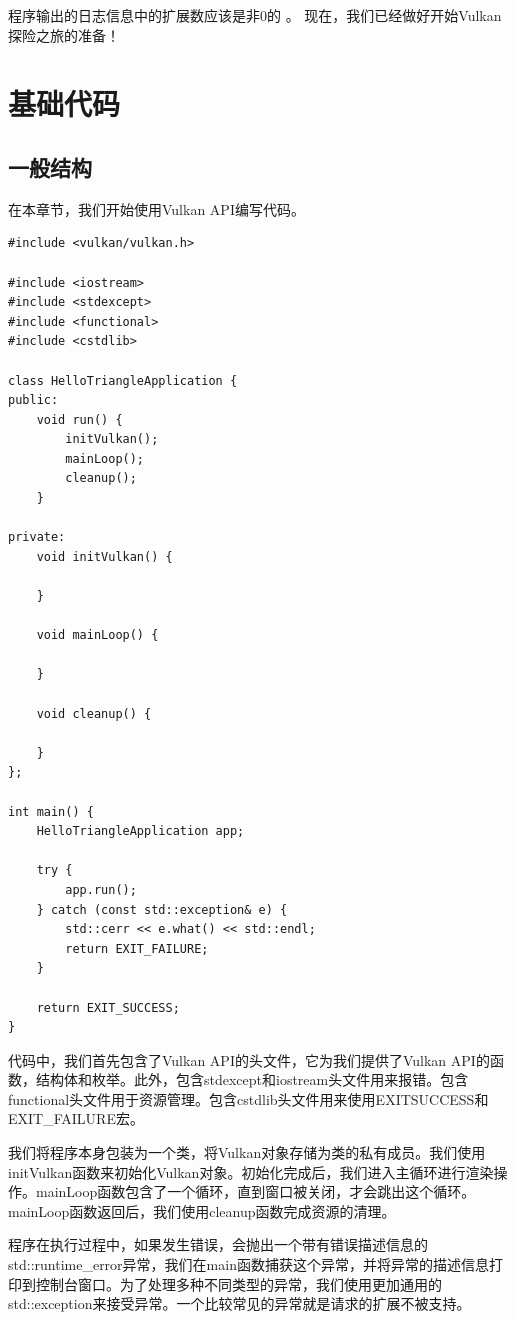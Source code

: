 \documentclass{ctexart}
\begin{document}
程序输出的日志信息中的扩展数应该是非0的
。
现在，我们已经做好开始Vulkan探险之旅的准备！

\newpage
\section{基础代码}

\subsection{一般结构}

在本章节，我们开始使用Vulkan API编写代码。

\begin{lstlisting}[language={[ANSI]C}]
#include <vulkan/vulkan.h>

#include <iostream>
#include <stdexcept>
#include <functional>
#include <cstdlib>

class HelloTriangleApplication {
public:
	void run() {
		initVulkan();
		mainLoop();
		cleanup();
	}

private:
	void initVulkan() {

	}

	void mainLoop() {

	}

	void cleanup() {

	}
};

int main() {
	HelloTriangleApplication app;

	try {
		app.run();
	} catch (const std::exception& e) {
		std::cerr << e.what() << std::endl;
		return EXIT_FAILURE;
	}

	return EXIT_SUCCESS;
}
\end{lstlisting}

代码中，我们首先包含了Vulkan API的头文件，它为我们提供了Vulkan API的函数，结构体和枚举。此外，包含stdexcept和iostream头文件用来报错。包含functional头文件用于资源管理。包含cstdlib头文件用来使用EXITSUCCESS和EXIT\_FAILURE宏。

我们将程序本身包装为一个类，将Vulkan对象存储为类的私有成员。我们使用initVulkan函数来初始化Vulkan对象。初始化完成后，我们进入主循环进行渲染操作。mainLoop函数包含了一个循环，直到窗口被关闭，才会跳出这个循环。mainLoop函数返回后，我们使用cleanup函数完成资源的清理。

程序在执行过程中，如果发生错误，会抛出一个带有错误描述信息的std::runtime\_error异常，我们在main函数捕获这个异常，并将异常的描述信息打印到控制台窗口。为了处理多种不同类型的异常，我们使用更加通用的std::exception来接受异常。一个比较常见的异常就是请求的扩展不被支持。
\end{document}
